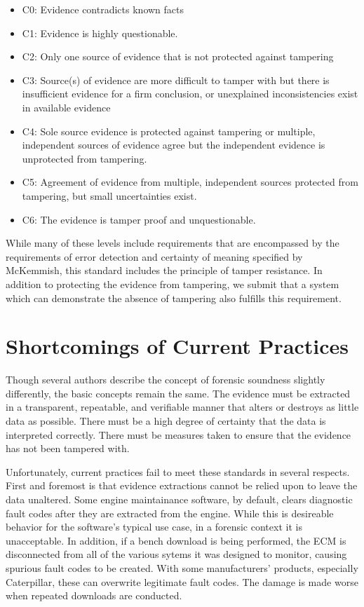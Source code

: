 \begin{itemize}
\item C0: Evidence contradicts known facts
\item C1: Evidence is highly questionable.
\item C2: Only one source of evidence that is not protected against tampering
\item C3: Source(s) of evidence are more difficult to tamper with but there is insufficient evidence for a firm conclusion, or unexplained inconsistencies exist in available evidence
\item C4: Sole source evidence is protected against tampering or multiple, independent sources of evidence agree but the independent evidence is unprotected from tampering.
\item C5: Agreement of evidence from multiple, independent sources protected from tampering, but small uncertainties exist.
\item C6: The evidence is tamper proof and unquestionable.
\end{itemize}

While many of these levels include requirements that are encompassed by the requirements of error detection and certainty of meaning 
specified by McKemmish, this standard includes the principle of tamper resistance. In addition to protecting the evidence from tampering, 
we submit that a system which can demonstrate the absence of tampering also fulfills this requirement.

\section{Shortcomings of Current Practices}

Though several authors describe the concept of forensic soundness slightly differently, the basic concepts remain the same. The evidence must be extracted in a transparent,
repeatable, and verifiable manner that alters or destroys as little data as possible. There must be a high degree of certainty that the data is interpreted correctly. There must
be measures taken to ensure that the evidence has not been tampered with.

Unfortunately, current practices fail to meet these standards in several respects. First and foremost is that evidence extractions cannot be relied upon to leave the data unaltered.
Some engine maintainance software, by default, clears diagnostic fault codes after they are extracted from the engine. While this is desireable behavior for the software's typical
use case, in a forensic context it is unacceptable. In addition, if a bench download is being performed, the ECM is disconnected from all of the various sytems it was designed to monitor,
causing spurious fault codes to be created. With some manufacturers' products, especially Caterpillar, these can overwrite legitimate fault codes. The damage is made worse when
repeated downloads are conducted.

